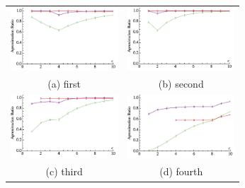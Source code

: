 \begin{figure}
\begin{tabular}{cc}
  \includegraphics[width=40mm]{images/l=25000,r=100000_Greedy_vs_Naive_error.png} &   \includegraphics[width=40mm]{images/l=50000,r=100000_Greedy_vs_Naive_error.png} \\
(a) first & (b) second \\[6pt]
 \includegraphics[width=40mm]{images/l=50000,r=100000,a=2_Greedy_vs_Naive_error.png} &   \includegraphics[width=40mm]{images/l=50000,r=100000,a=4_Greedy_vs_Naive_error.png}\\
(c) third & (d) fourth \\[6pt]
\end{tabular}
\end{figure}



